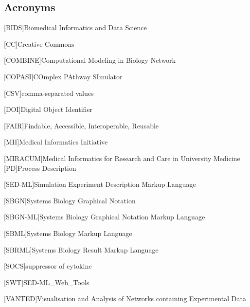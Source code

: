 \subsection*{Acronyms}
    \begin{acronym}[acrmeta]
        
        [BIDS]{Biomedical Informatics and Data Science}
       
       [CC]{Creative Commons}
       
        [COMBINE]{Computational Modeling in Biology Network}
        
        [COPASI]{COmplex PAthway SImulator}
        
        [CSV]{comma-separated values}
        
        [DOI]{Digital Object Identifier}
        
        [FAIR]{Findable, Accessible, Interoperable, Reusable}
        
        [MII]{Medical Informatics Initiative}
        
        [MIRACUM]{Medical Informatics for Research and Care in University
Medicine}
        [PD]{Process Description}
        
        [SED-ML]{Simulation Experiment Description Markup Language}
        
        [SBGN]{Systems Biology Graphical Notation}
        
        [SBGN-ML]{Systems Biology Graphical Notation Markup Language}
        
        [SBML]{Systems Biology Markup Language}
        
        [SBRML]{Systems Biology Result Markup Language}
        
        [SOCS]{suppressor of cytokine}
        
                [SWT]{SED-ML\_Web\_Tools}
        
        [VANTED]{Visualisation and Analysis of Networks containing Experimental Data}

    \end{acronym}